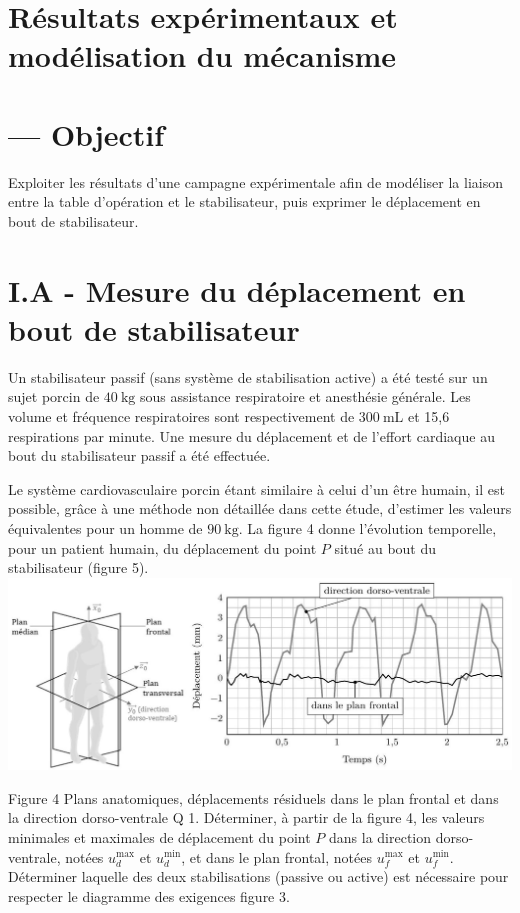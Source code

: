 \documentclass[10pt]{article}
\begin{document}
\section{Résultats expérimentaux et modélisation du mécanisme}
\section{— Objectif}
Exploiter les résultats d'une campagne expérimentale afin de modéliser la liaison entre la table d'opération et le stabilisateur, puis exprimer le déplacement en bout de stabilisateur.

\section{I.A - Mesure du déplacement en bout de stabilisateur}
Un stabilisateur passif (sans système de stabilisation active) a été testé sur un sujet porcin de $40 \mathrm{~kg}$ sous assistance respiratoire et anesthésie générale. Les volume et fréquence respiratoires sont respectivement de $300 \mathrm{~mL}$ et 15,6 respirations par minute. Une mesure du déplacement et de l'effort cardiaque au bout du stabilisateur passif a été effectuée.

Le système cardiovasculaire porcin étant similaire à celui d'un être humain, il est possible, grâce à une méthode non détaillée dans cette étude, d'estimer les valeurs équivalentes pour un homme de $90 \mathrm{~kg}$. La figure 4 donne l'évolution temporelle, pour un patient humain, du déplacement du point $P$ situé au bout du stabilisateur (figure 5).
\includegraphics[max width=\textwidth, center]{2023_07_26_54f5e859400a10e656ddg-02}

Figure 4 Plans anatomiques, déplacements résiduels dans le plan frontal et dans la direction dorso-ventrale Q 1. Déterminer, à partir de la figure 4, les valeurs minimales et maximales de déplacement du point $P$ dans la direction dorso-ventrale, notées $u_{d}^{\max }$ et $u_{d}^{\min }$, et dans le plan frontal, notées $u_{f}^{\max }$ et $u_{f}^{\min }$. Déterminer laquelle des deux stabilisations (passive ou active) est nécessaire pour respecter le diagramme des exigences figure 3.
\end{document}
